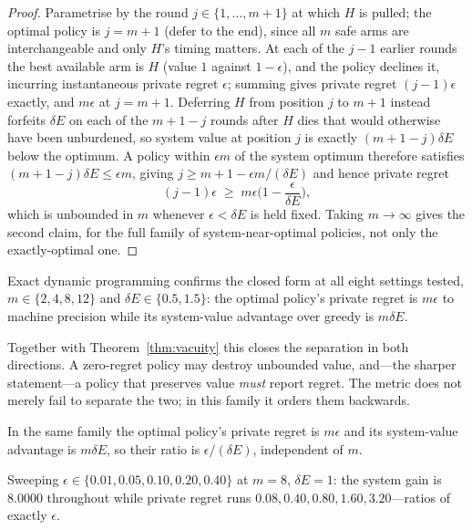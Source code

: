 \begin{proof}
Parametrise by the round $j\in\{1,\dots,m{+}1\}$ at which $H$ is pulled; the
optimal policy is $j=m{+}1$ (defer to the end), since all $m$ safe arms are
interchangeable and only $H$'s timing matters. At each of the $j-1$ earlier
rounds the best available arm is $H$ (value $1$ against $1-\epsilon$), and the
policy declines it, incurring instantaneous private regret $\epsilon$; summing
gives private regret $(j{-}1)\epsilon$ exactly, and $m\epsilon$ at $j=m{+}1$.
Deferring $H$ from position $j$ to $m{+}1$ instead forfeits $\delta E$ on each
of the $m{+}1{-}j$ rounds after $H$ dies that would otherwise have been
unburdened, so system value at position $j$ is exactly $(m{+}1{-}j)\delta E$
below the optimum. A policy within $\epsilon m$ of the system optimum
therefore satisfies $(m{+}1{-}j)\delta E \le \epsilon m$, giving
$j \ge m{+}1-\epsilon m/(\delta E)$ and hence private regret
\[
(j-1)\epsilon \;\ge\; m\epsilon\Big(1-\frac{\epsilon}{\delta E}\Big),
\]
which is unbounded in $m$ whenever $\epsilon<\delta E$ is held fixed. Taking
$m\to\infty$ gives the second claim, for the full family of system-near-optimal
policies, not only the exactly-optimal one.
\end{proof}

Exact dynamic programming confirms the closed form at all eight settings tested,
$m \in \{2,4,8,12\}$ and $\delta E \in \{0.5,1.5\}$: the optimal policy's private
regret is $m\epsilon$ to machine precision while its system-value advantage over
greedy is $m\delta E$.

Together with Theorem~\ref{thm:vacuity} this closes the separation in both
directions. A zero-regret policy may destroy unbounded value, and---the sharper
statement---a policy that preserves value \emph{must} report regret. The metric does
not merely fail to separate the two; in this family it orders them backwards.

\begin{corollary}
\label{cor:tracks}
In the same family the optimal policy's private regret is $m\epsilon$ and its
system-value advantage is $m\delta E$, so their ratio is $\epsilon/(\delta E)$,
independent of $m$.
\end{corollary}

Sweeping $\epsilon \in \{0.01,0.05,0.10,0.20,0.40\}$ at $m=8$, $\delta E=1$: the
system gain is $8.0000$ throughout while private regret runs $0.08, 0.40, 0.80,
1.60, 3.20$---ratios of exactly $\epsilon$.

